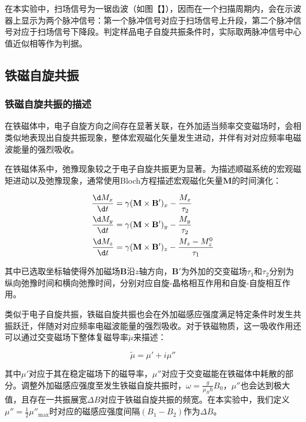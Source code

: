 \documentclass{thuemp}
\begin{document}
在本实验中，扫场信号为一锯齿波（如图【】），因而在一个扫描周期内，会在示波器上显示为两个脉冲信号：第一个脉冲信号对应于扫场信号上升段，第二个脉冲信号对应于扫场信号下降段。判定样品电子自旋共振条件时，实际取两脉冲信号中心值近似相等作为判据。

\subsection{铁磁自旋共振}

\subsubsection{铁磁自旋共振的描述}

在铁磁体中，电子自旋方向之间存在显著关联，在外加适当频率交变磁场时，会相类似地表现出自旋共振现象，整体宏观磁化矢量发生进动，并伴有对对应频率电磁波能量的强烈吸收。

在铁磁体系中，弛豫现象较之于电子自旋共振更为显著。为描述顺磁系统的宏观磁矩进动以及弛豫现象，通常使用Bloch方程描述宏观磁化矢量$\mathbf{M}$的时间演化：

\begin{equation}
\begin{aligned}
    \frac{\d M_x}{\d t} &= \gamma (\mathbf{M} \times \mathbf{B'})_x - \frac{M_x}{\tau_2} \\
    \frac{\d M_y}{\d t} &= \gamma (\mathbf{M} \times \mathbf{B'})_y - \frac{M_y}{\tau_2} \\
    \frac{\d M_z}{\d t} &= \gamma (\mathbf{M} \times \mathbf{B'})_z - \frac{M_z - M_z^0}{\tau_1}
\end{aligned}
\end{equation}

其中已选取坐标轴使得外加磁场$\mathbf{B}$沿$z$轴方向，$\mathbf{B'}$为外加的交变磁场$\tau_1$和$\tau_2$分别为纵向弛豫时间和横向弛豫时间，分别对应自旋-晶格相互作用和自旋-自旋相互作用。

类似于电子自旋共振，铁磁自旋共振也会在外加磁感应强度满足特定条件时发生共振跃迁，伴随对对应频率电磁波能量的强烈吸收。对于铁磁物质，这一吸收作用还可以通过交变磁场下整体复磁导率$\tilde\mu $来描述：

\begin{equation}
    \tilde\mu = \mu' + i\mu''
\end{equation}

其中$\mu'$对应于其在稳定磁场下的磁导率，$\mu''$对应于交变磁能在铁磁体中耗散的部分。调整外加磁感应强度至发生铁磁自旋共振时，$\omega = \frac{g}{\mu_B\hbar} B_0$，$\mu''$也会达到极大值，且存在一共振展宽$\Delta B$对应于铁磁自旋共振的频宽。在本实验中，我们定义$\mu'' = \frac 1 2 \mu''_{\mathrm{max}}$时对应的磁感应强度间隔$(B_1 - B_2)$作为$\Delta B$。
\end{document}
